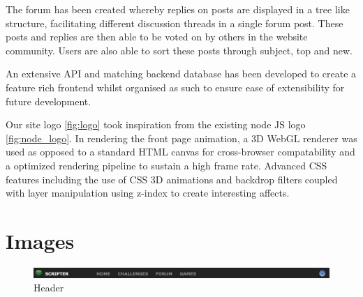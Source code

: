 \documentclass[a4paper]{article}
\begin{document}
The forum has been created whereby replies on posts are displayed in a tree like
structure, facilitating different discussion threads in a single forum post.
These posts and replies are then able to be voted on by others in the website
community. Users are also able to sort these posts through subject, top and new.

An extensive API and matching backend database has been developed to create a
feature rich frontend whilst organised as such to ensure ease of extensibility
for future development.

Our site logo \ref{fig:logo} took inspiration from the existing node JS logo \ref{fig:node_logo}.
In rendering the front page animation, a 3D WebGL renderer was used as opposed to a standard HTML canvas for cross-browser compatability and a optimized rendering pipeline to sustain a high frame rate.
Advanced CSS features including the use of CSS 3D animations and backdrop filters coupled with layer manipulation using z-index to create interesting affects.


\appendix

\section{Images}

\begin{figure}[h!]
  \centering
  \includegraphics[width=1\linewidth]{images/header.png}
  \caption{Header}
  \label{fig:header}
\end{figure}

\begin{figure}[h!]
  \centering

\end{figure}
\end{document}
